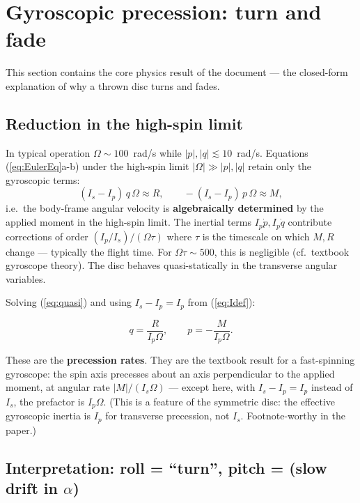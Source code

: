 \documentclass[11pt,letterpaper]{article}
\begin{document}
\section{Gyroscopic precession: turn and fade}
\label{sec:precess}

This section contains the core physics result of the document --- the closed-form explanation of why a thrown disc turns and fades.

\subsection{Reduction in the high-spin limit}

In typical operation $\Omega \sim 100$~rad/s while $|p|, |q| \lesssim 10$~rad/s. Equations (\ref{eq:EulerEq}a-b) under the high-spin limit $|\Omega| \gg |p|, |q|$ retain only the gyroscopic terms:
\begin{equation}
(I_s - I_p)\,q\,\Omega \approx R, \qquad
-(I_s - I_p)\,p\,\Omega \approx M,
\label{eq:quasi}
\end{equation}
i.e.\ the body-frame angular velocity is \textbf{algebraically determined} by the applied moment in the high-spin limit. The inertial terms $I_p \dot{p}, I_p \dot{q}$ contribute corrections of order $(I_p / I_s)/(\Omega \tau)$ where $\tau$ is the timescale on which $M, R$ change --- typically the flight time. For $\Omega \tau \sim 500$, this is negligible (cf.\ textbook gyroscope theory). The disc behaves quasi-statically in the transverse angular variables.

Solving (\ref{eq:quasi}) and using $I_s - I_p = I_p$ from (\ref{eq:Idef}):
\begin{keyeq}
\begin{equation}
q = \frac{R}{I_p \Omega}, \qquad
p = -\frac{M}{I_p \Omega}.
\label{eq:precess}
\end{equation}
\end{keyeq}
These are the \textbf{precession rates}. They are the textbook result for a fast-spinning gyroscope: the spin axis precesses about an axis perpendicular to the applied moment, at angular rate $|M|/(I_s\Omega)$ --- except here, with $I_s - I_p = I_p$ instead of $I_s$, the prefactor is $I_p \Omega$. (This is a feature of the symmetric disc: the effective gyroscopic inertia is $I_p$ for transverse precession, not $I_s$. Footnote-worthy in the paper.)

\subsection{Interpretation: roll = ``turn'', pitch = (slow drift in $\alpha$)}
\end{document}
